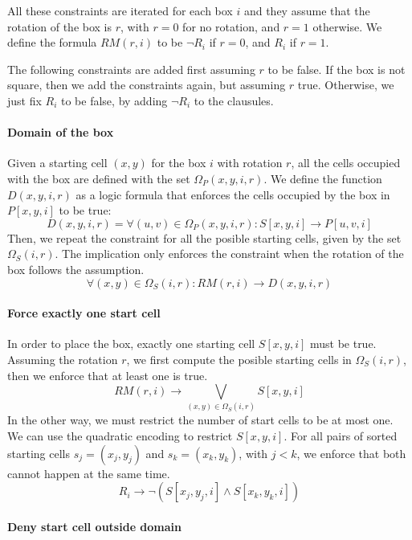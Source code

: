 \documentclass[a4paper]{article}
\begin{document}
All these constraints are iterated for each box $i$ and they assume that the 
rotation of the box is $r$, with $r=0$ for no rotation, and $r=1$ otherwise.
We define the formula $RM(r,i)$ to be $\lnot R_i$ if $r = 0$, and $R_i$ if $r 
=1$.

The following constraints are added first assuming $r$ to be false. If the box 
is not square, then we add the constraints again, but assuming $r$ true.  
Otherwise, we just fix $R_i$ to be false, by adding $\lnot R_i$ to the 
clausules.

\paragraph{Domain of the box}
Given a starting cell $(x,y)$ for the box $i$ with rotation $r$, all the cells 
occupied with the box are defined with the set $\Omega_P(x,y,i,r)$. We define 
the function $D(x,y,i,r)$ as a logic formula that enforces the cells occupied by 
the box in $P[x,y,i]$ to be true:
%
$$D(x,y,i,r) = \forall (u,v) \in \Omega_P(x,y,i,r): S[x,y,i] \to P[u,v,i] $$
%
Then, we repeat the constraint for all the posible starting cells, given by the 
set $\Omega_S(i,r)$. The implication only enforces the constraint when the 
rotation of the box follows the assumption.
%
$$\forall (x,y) \in \Omega_S(i,r) : RM(r,i) \to D(x,y,i,r)$$



\paragraph{Force exactly one start cell}
In order to place the box, exactly one starting cell $S[x,y,i]$ must be true.  
Assuming the rotation $r$, we first compute the posible starting cells in 
$\Omega_S(i,r)$, then we enforce that at least one is true.
%
$$RM(r,i) \to \bigvee_{ (x,y) \in \Omega_S(i,r)} S[x,y,i]$$
%
In the other way, we must restrict the number of start cells to be at most one.  
We can use the quadratic encoding to restrict $S[x,y,i]$. For all pairs of 
sorted starting cells $s_j = (x_j, y_j)$ and $s_k = (x_k, y_k)$, with $j < k$, 
we enforce that both cannot happen at the same time.
%
$$ R_i \to \lnot (S[x_j,y_j,i] \land S[x_k,y_k,i])$$
%




\paragraph{Deny start cell outside domain}
\end{document}
